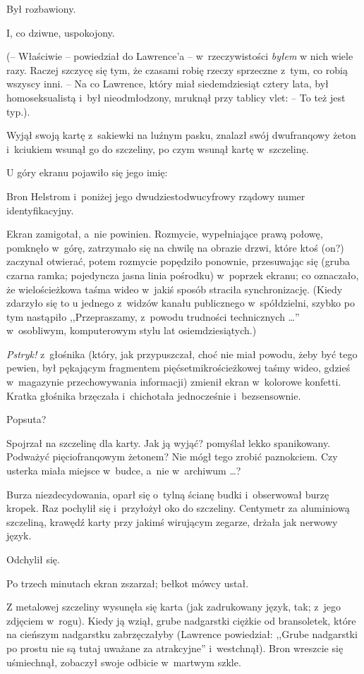 \documentclass[oneside,polish,11pt,rmheadings]{mwbk}
\begin{document}
Był rozbawiony. 

I, co dziwne, uspokojony. 

(-- Właściwie -- powiedział do Lawrence'a -- w~rzeczywistości \textit{byłem }w nich wiele razy. Raczej szczycę się tym, że czasami robię rzeczy sprzeczne z~tym, co robią wszyscy inni. -- Na co Lawrence, który miał siedemdziesiąt cztery lata, był homoseksualistą i~był nieodmłodzony, mruknął przy tablicy vlet: -- To też jest typ.). 

Wyjął swoją kartę z~sakiewki na luźnym pasku, znalazł swój dwufranqowy żeton i~kciukiem wsunął go do szczeliny, po czym wsunął kartę w~szczelinę. 

U góry ekranu pojawiło się jego imię:  

Bron Helstrom i~poniżej jego dwudziestodwucyfrowy rządowy numer identyfikacyjny. 

Ekran zamigotał, a~nie powinien. Rozmycie, wypełniające prawą połowę, pomknęło w~górę, zatrzymało się na chwilę na obrazie drzwi, które ktoś (on?) zaczynał otwierać, potem rozmycie popędziło ponownie, przesuwając się (gruba czarna ramka; pojedyncza jasna linia pośrodku) w~poprzek ekranu; co oznaczało, że wielościeżkowa taśma wideo w~jakiś sposób straciła synchronizację. (Kiedy zdarzyło się to u jednego z~widzów kanału publicznego w~spółdzielni, szybko po tym nastąpiło ,,Przepraszamy, z~powodu trudności technicznych \ldots '' w~osobliwym, komputerowym stylu lat osiemdziesiątych.) 

\textit{Pstryk!} z~głośnika (który, jak przypuszczał, choć nie miał powodu, żeby być tego pewien, był pękającym fragmentem pięćsetmikrościeżkowej taśmy wideo, gdzieś w~magazynie przechowywania informacji) zmienił ekran w~kolorowe konfetti. Kratka głośnika brzęczała i~chichotała jednocześnie i~bezsensownie.

Popsuta? 

Spojrzał na szczelinę dla karty. Jak ją wyjąć? pomyślał lekko spanikowany. Podważyć pięciofranqowym żetonem? Nie mógł tego zrobić paznokciem. Czy usterka miała miejsce w~budce, a~nie w~archiwum \ldots ? 

Burza niezdecydowania, oparł się o~tylną ścianę budki i~obserwował burzę kropek. Raz pochylił się i~przyłożył oko do szczeliny. Centymetr za aluminiową szczeliną, krawędź karty przy jakimś wirującym zegarze, drżała jak nerwowy język. 

Odchylił się. 

Po trzech minutach ekran zszarzał; bełkot mówcy ustał. 

Z metalowej szczeliny wysunęła się karta (jak zadrukowany język, tak; z~jego zdjęciem w~rogu). Kiedy ją wziął, grube nadgarstki ciężkie od bransoletek, które na cieńszym nadgarstku zabrzęczałyby (Lawrence powiedział: ,,Grube nadgarstki po prostu nie są tutaj uważane za atrakcyjne'' i~westchnął). Bron wreszcie się uśmiechnął, zobaczył swoje odbicie w~martwym szkle. 
\end{document}
